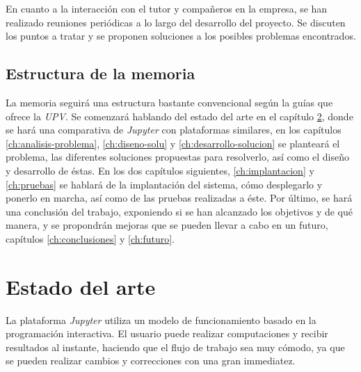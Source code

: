 \documentclass[11pt,spanish,listoffigures]{tfgetsinf}
\begin{document}
En cuanto a la interacción con el tutor y compañeros en la empresa, se han realizado reuniones periódicas a lo largo del desarrollo del proyecto. Se discuten los puntos a tratar y se proponen soluciones a los posibles problemas encontrados.



\section{Estructura de la memoria}
\label{sec:estructura}

La memoria seguirá una estructura bastante convencional según la guías que ofrece la \textit{UPV}. Se comenzará hablando del estado del arte en el capítulo \ref{ch:state-of-art}, donde se hará una comparativa de \textit{Jupyter} con plataformas similares, en los capítulos \ref{ch:analisis-problema}, \ref{ch:diseno-solu} y \ref{ch:desarrollo-solucion} se planteará el problema, las diferentes soluciones propuestas para resolverlo, así como el diseño y desarrollo de éstas. En los dos capítulos siguientes, \ref{ch:implantacion} y \ref{ch:pruebas} se hablará de la implantación del sistema, cómo desplegarlo y ponerlo en marcha, así como de las pruebas realizadas a éste. Por último, se hará una conclusión del trabajo, exponiendo si se han alcanzado los objetivos y de qué manera, y se propondrán mejoras que se pueden llevar a cabo en un futuro, capítulos \ref{ch:conclusiones} y \ref{ch:futuro}. 







\chapter{Estado del arte}
\label{ch:state-of-art}

La plataforma \textit{Jupyter} utiliza un modelo de funcionamiento basado en la programación interactiva. El usuario puede realizar computaciones y recibir resultados al instante, haciendo que el flujo de trabajo sea muy cómodo, ya que se pueden realizar cambios y correcciones con una gran immediatez.
\end{document}
